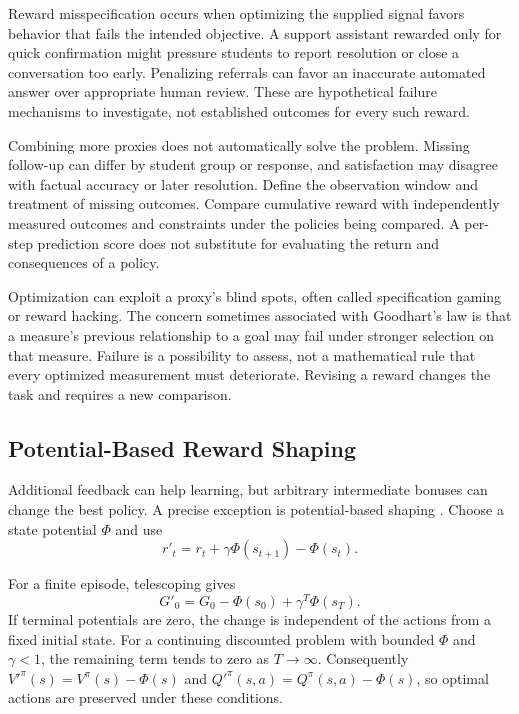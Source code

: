 Reward misspecification occurs when optimizing the supplied signal favors behavior that fails the intended objective. A support assistant rewarded only for quick confirmation might pressure students to report resolution or close a conversation too early. Penalizing referrals can favor an inaccurate automated answer over appropriate human review. These are hypothetical failure mechanisms to investigate, not established outcomes for every such reward.

Combining more proxies does not automatically solve the problem. Missing follow-up can differ by student group or response, and satisfaction may disagree with factual accuracy or later resolution. Define the observation window and treatment of missing outcomes. Compare cumulative reward with independently measured outcomes and constraints under the policies being compared. A per-step prediction score does not substitute for evaluating the return and consequences of a policy.

Optimization can exploit a proxy's blind spots, often called specification gaming or reward hacking. The concern sometimes associated with Goodhart's law is that a measure's previous relationship to a goal may fail under stronger selection on that measure. Failure is a possibility to assess, not a mathematical rule that every optimized measurement must deteriorate. Revising a reward changes the task and requires a new comparison.

\par\noindent\begin{minipage}{\linewidth}
\subsection{Potential-Based Reward Shaping}

Additional feedback can help learning, but arbitrary intermediate bonuses can change the best policy. A precise exception is potential-based shaping \citep{ng1999shaping}. Choose a state potential $\Phi$ and use
\[
r'_t=r_t+\gamma\Phi(s_{t+1})-\Phi(s_t).
\]
\end{minipage}\par\addvspace{\belowdisplayskip}
For a finite episode, telescoping gives
\[
G'_0=G_0-\Phi(s_0)+\gamma^T\Phi(s_T).
\]
If terminal potentials are zero, the change is independent of the actions from a fixed initial state. For a continuing discounted problem with bounded $\Phi$ and $\gamma<1$, the remaining term tends to zero as $T\to\infty$. Consequently $V'^\pi(s)=V^\pi(s)-\Phi(s)$ and $Q'^\pi(s,a)=Q^\pi(s,a)-\Phi(s)$, so optimal actions are preserved under these conditions.

